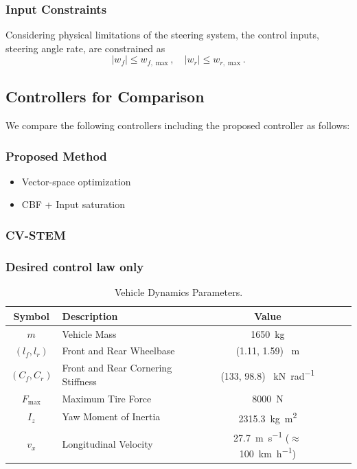 \documentclass[letterpaper, 10 pt, conference]{ieeeconf}
\begin{document}
\subsubsection*{Input Constraints}
Considering physical limitations of the steering system, the control inputs, steering angle rate, are constrained as
\begin{equation}
    \vert w_f \vert \leq w_{f,\max}, \quad  \vert w_r \vert \leq w_{r,\max}
    .
\end{equation}

\subsection{Controllers for Comparison}

We compare the following controllers including the proposed controller as follows:

\subsubsection*{Proposed Method}

\begin{itemize}
    \item Vector-space optimization
    \item CBF + Input saturation
\end{itemize}

\subsubsection*{CV-STEM}

\subsubsection*{Desired control law only}



\begin{table}[t]
\renewcommand{\arraystretch}{1.3}
\caption{Vehicle Dynamics Parameters.}
\centering
\begin{tabular}{c m{9.5em} c c c }
    \hline
    \textbf{Symbol} & \textbf{Description} & \textbf{Value} \\
    \hline
    \hline 
    $m$ & Vehicle Mass & \qty{1650}{\kilo\gram} \\
    \hline
    $(l_f,l_r)$  & Front and Rear Wheelbase & (\qty{1.11}{}, \qty{1.59}{}) \qty{}{\meter} \\  
    \hline
    $(C_f,C_r)$ & Front and Rear Cornering Stiffness & (\qty{133}{}, \qty{98.8}{}) \qty{}{\kilo\newton\per\radian} \\
    \hline
    $F_{\max}$ & Maximum Tire Force & \qty{8000}{\newton} \\
    \hline
    $I_z$ & Yaw Moment of Inertia & \qty{2315.3}{\kilo\gram\meter\squared} \\
    \hline
    $v_x$ & Longitudinal Velocity & \qty{27.7}{\meter\per\second} ($\approx$ \qty{100}{\kilo\meter\per\hour}) \\
    \hline
    \end{tabular}
    \label{table:example}
\end{table}
\end{document}
